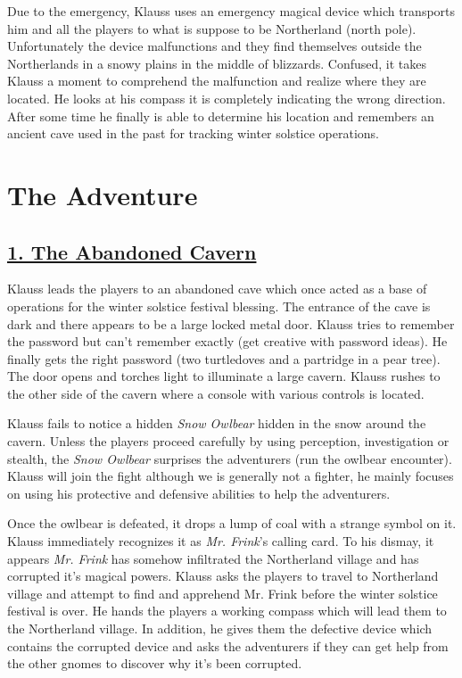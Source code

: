 \documentclass{article}
\begin{document}
\begin{multicols*}{2}
	Due to the emergency, Klauss uses an emergency magical device which transports him and all the players to what is suppose to be Northerland (north pole). Unfortunately the device malfunctions and they find themselves outside the Northerlands in a snowy plains in the middle of blizzards. Confused, it takes Klauss a moment to comprehend the malfunction and realize where they are located. He looks at his compass it is completely indicating the wrong direction. After some time he finally is able to determine his location and remembers an ancient cave used in the past for tracking winter solstice operations. 
	
	\section{The Adventure}
	\subsection*{\underline{1. The Abandoned Cavern}}
	
	Klauss leads the players to an abandoned cave which once acted as a base of operations for the winter solstice festival blessing. The entrance of the cave is dark and there appears to be a large locked metal door. Klauss tries to remember the password but can't remember exactly (get creative with password ideas). He finally gets the right password (two turtledoves and a partridge in a pear tree). The door opens and torches light to illuminate a large cavern. Klauss rushes to the other side of the cavern where a console with various controls is located.
	
	Klauss fails to notice a hidden \emph{Snow Owlbear} hidden in the snow around the cavern. Unless the players proceed carefully by using perception, investigation or stealth, the \emph{Snow Owlbear} surprises the adventurers (run the owlbear encounter). Klauss will join the fight although we is generally not a fighter, he mainly focuses on using his protective and defensive abilities to help the adventurers.
	
	Once the owlbear is defeated, it drops a lump of coal with a strange symbol on it. Klauss immediately recognizes it as \emph{Mr. Frink}'s calling card. To his dismay, it appears \emph{Mr. Frink} has somehow infiltrated the Northerland village and has corrupted it's magical powers. Klauss asks the players to travel to Northerland village and attempt to find and apprehend Mr. Frink before the winter solstice festival is over. He hands the players a working compass which will lead them to the Northerland village. In addition, he gives them the defective device which contains the corrupted device and asks the adventurers if they can get help from the other gnomes to discover why it's been corrupted.
	

\end{multicols*}
\end{document}
